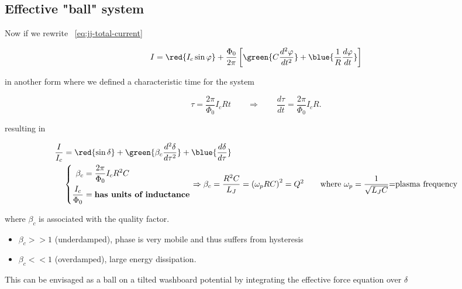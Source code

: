\subsection{Effective "ball" system}
\label{sec:effect-ball-syst}

Now if we rewrite ~\autoref{eq:jj-total-current}

\begin{equation}\label{eq:jj-force-equation}
  I = \red{I_c\sin\varphi} + \frac{\Phi_0}{2\pi}\left[ \green{C
      \frac{d^2\varphi}{dt^{2}}}                                +
    \blue{\frac{1}{R}\frac{d\varphi}{dt}} \right]
\end{equation}

\noindent in another form where  we defined a characteristic time for
the system

\begin{equation}
  \tau = \frac{2\pi}{\Phi_0}I_cR t  \qquad \Rightarrow \qquad \frac{d\tau}{dt} = \frac{2\pi}{\Phi_0}I_cR.
\end{equation}

\noindent resulting in

\begin{equation}\label{eq:jj-damping}
  \begin{aligned}
    \frac{I}{I_c} &= \red{\sin\delta} + \green{\beta_{c} \frac{d^2\delta}{d\tau^2}} + \blue{\frac{d\delta}{d\tau}} \\
    & \left\lbrace
      \begin{aligned}
        \beta_c & = \frac{2\pi}{\Phi_0}I_cR^2C\\
        \frac{I_c}{\Phi_0} & = \textbf{has units of inductance}
      \end{aligned}
    \right.    \Rightarrow  \beta_c   =  \frac{R^2C}{L_J}   =  \left(
      \omega_pRC  \right)^2 =  Q^2  \qquad \text{where  } \omega_p  =
    \frac{1}{\sqrt{L_JC}} \text{=plasma frequency}
  \end{aligned}
\end{equation}

\noindent where $\beta_c$ is associated with the quality factor.
\begin{itemize}
\item  $\beta_c>> 1$  (underdamped), phase  is very  mobile and  thus
  suffers from hysteresis
\item $\beta_c << 1$ (overdamped), large energy dissipation.
\end{itemize}

This can  be envisaged as a  ball on a tilted  washboard potential by
integrating the effective force equation over $\delta$

